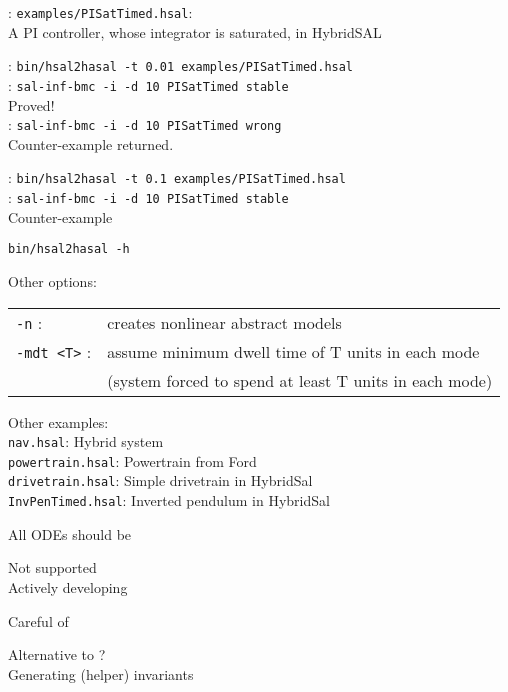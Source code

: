 \documentclass{seminar}
\begin{document}
\begin{slide}

\bigskip
{}: {\tt{examples/PISatTimed.hsal}}: 
\\
A PI controller, whose integrator is saturated, in HybridSAL

\bigskip
{}: {\tt{bin/hsal2hasal -t 0.01 examples/PISatTimed.hsal}}
\\
{}: {\tt{sal-inf-bmc -i -d 10 PISatTimed stable}} 
\\
Proved!
\\
{}: {\tt{sal-inf-bmc -i -d 10 PISatTimed wrong}} 
\\
Counter-example returned.

\bigskip
{}: {\tt{bin/hsal2hasal -t 0.1 examples/PISatTimed.hsal}}
\\
{}: {\tt{sal-inf-bmc -i -d 10 PISatTimed stable}} 
\\
Counter-example

\end{slide}
\begin{slide}

{\tt{bin/hsal2hasal -h}}

Other options:
\begin{tabular}{ll}
{\tt{-n}} : & creates nonlinear abstract models
\\
{\tt{-mdt <T>}} : & assume minimum dwell time of T units in each mode
\\
 & (system  forced to spend at least T units in each mode)
\end{tabular}

\bigskip

Other examples:
\\
{\tt{nav.hsal}}: Hybrid system {}
\\
{\tt{powertrain.hsal}}: Powertrain from Ford
\\
{\tt{drivetrain.hsal}}: Simple drivetrain  in HybridSal
\\
{\tt{InvPenTimed.hsal}}: Inverted pendulum in HybridSal


\end{slide}
\begin{slide}

All ODEs should be {}

Not {} supported
\\
Actively developing

Careful of {}

Alternative to {} ?
\\
Generating (helper) invariants 



\end{slide}
\end{document}
